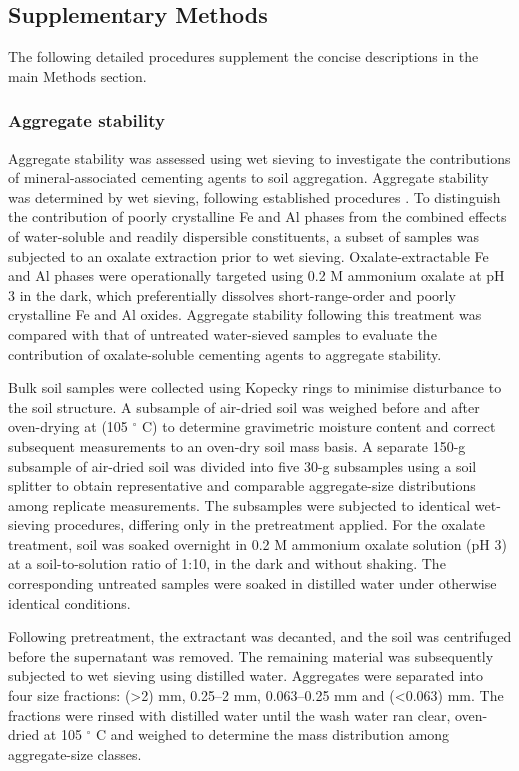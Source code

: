 \documentclass[preprint,12pt]{elsarticle}
\begin{document}
\subsection{Supplementary Methods}
\label{sec:si_methods}

The following detailed procedures supplement the concise descriptions in the main Methods section.

\subsubsection{Aggregate stability}

Aggregate stability was assessed using wet sieving to investigate the contributions of mineral-associated cementing agents to soil aggregation. Aggregate stability was determined by wet sieving, following established procedures \citep{KemperRosenau2018}. To distinguish the contribution of poorly crystalline Fe and Al phases from the combined effects of water-soluble and readily dispersible constituents, a subset of samples was subjected to an oxalate extraction prior to wet sieving. Oxalate-extractable Fe and Al phases were operationally targeted using 0.2 M ammonium oxalate at pH 3 in the dark, which preferentially dissolves short-range-order and poorly crystalline Fe and Al oxides. Aggregate stability following this treatment was compared with that of untreated water-sieved samples to evaluate the contribution of oxalate-soluble cementing agents to aggregate stability.

Bulk soil samples were collected using Kopecky rings to minimise disturbance to the soil structure. A subsample of air-dried soil was weighed before and after oven-drying at (105 $^\circ$ C) to determine gravimetric moisture content and correct subsequent measurements to an oven-dry soil mass basis. A separate 150-g subsample of air-dried soil was divided into five 30-g subsamples using a soil splitter to obtain representative and comparable aggregate-size distributions among replicate measurements. The subsamples were subjected to identical wet-sieving procedures, differing only in the pretreatment applied. For the oxalate treatment, soil was soaked overnight in 0.2 M ammonium oxalate solution (pH 3) at a soil-to-solution ratio of 1:10, in the dark and without shaking. The corresponding untreated samples were soaked in distilled water under otherwise identical conditions.

Following pretreatment, the extractant was decanted, and the soil was centrifuged before the supernatant was removed. The remaining material was subsequently subjected to wet sieving using distilled water. Aggregates were separated into four size fractions: (>2) mm, 0.25--2 mm, 0.063--0.25 mm and (<0.063) mm. The fractions were rinsed with distilled water until the wash water ran clear, oven-dried at 105 $^\circ$ C and weighed to determine the mass distribution among aggregate-size classes.
\end{document}

